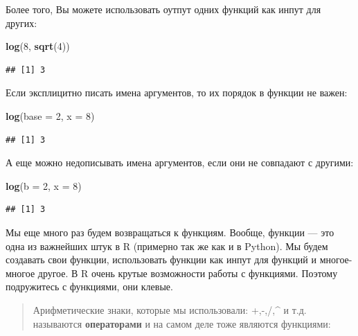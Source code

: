 \documentclass[]{book}
\newenvironment{Shaded}{\begin{snugshade}}{\end{snugshade}}
\newcommand{\DataTypeTok}[1]{\textcolor[rgb]{0.13,0.29,0.53}{#1}}
\newcommand{\DecValTok}[1]{\textcolor[rgb]{0.00,0.00,0.81}{#1}}
\newcommand{\KeywordTok}[1]{\textcolor[rgb]{0.13,0.29,0.53}{\textbf{#1}}}
\newcommand{\NormalTok}[1]{#1}
\begin{document}
Более того, Вы можете использовать оутпут одних функций как инпут для других:

\begin{Shaded}
\begin{Highlighting}[]
\KeywordTok{log}\NormalTok{(}\DecValTok{8}\NormalTok{, }\KeywordTok{sqrt}\NormalTok{(}\DecValTok{4}\NormalTok{))}
\end{Highlighting}
\end{Shaded}

\begin{verbatim}
## [1] 3
\end{verbatim}

Если эксплицитно писать имена аргументов, то их порядок в функции не важен:

\begin{Shaded}
\begin{Highlighting}[]
\KeywordTok{log}\NormalTok{(}\DataTypeTok{base =} \DecValTok{2}\NormalTok{, }\DataTypeTok{x =} \DecValTok{8}\NormalTok{)}
\end{Highlighting}
\end{Shaded}

\begin{verbatim}
## [1] 3
\end{verbatim}

А еще можно недописывать имена аргументов, если они не совпадают с другими:

\begin{Shaded}
\begin{Highlighting}[]
\KeywordTok{log}\NormalTok{(}\DataTypeTok{b =} \DecValTok{2}\NormalTok{, }\DataTypeTok{x =} \DecValTok{8}\NormalTok{)}
\end{Highlighting}
\end{Shaded}

\begin{verbatim}
## [1] 3
\end{verbatim}

Мы еще много раз будем возвращаться к функциям. Вообще, функции --- это одна из важнейших штук в R (примерно так же как и в Python). Мы будем создавать свои функции, использовать функции как инпут для функций и многое-многое другое. В R очень крутые возможности работы с функциями. Поэтому подружитесь с функциями, они клевые.

\begin{quote}
Арифметические знаки, которые мы использовали: +,-,/,\^{} и т.д. называются \textbf{операторами} и на самом деле тоже являются функциями:
\end{quote}
\end{document}
